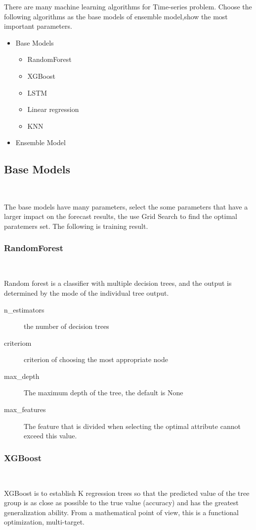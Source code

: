 There are many machine learning algorithms 
for Time-series problem. 
Choose the following algorithms
as the base models of ensemble model,show the most important parameters.

\begin{itemize}
    \item Base Models
	\
\begin{itemize}
	\item RandomForest 
	\item XGBoost
	\item LSTM
	\item Linear regression
	\item KNN
\end{itemize}
\item Ensemble Model
\end{itemize}
\subsection{Base Models}
\

The base models have many parameters,
select the some parameters that 
have a larger impact on 
the forecast results,
the use Grid Search to find 
the optimal paratemers set.	
The following is training result. 
\subsubsection{RandomForest}
\

Random forest is a classifier with 
multiple decision trees, and
the output is determined by 
the mode of the individual tree output.


\begin{description}
	\item[n_estimators] the number of decision trees
	\item[criteriom] criterion of choosing 
	the most appropriate node
	\item[max_depth] The maximum depth of the tree, 
	the default is None 
	\item[max_features] The feature that is divided 
	when selecting the optimal attribute 
	cannot exceed this value.
\end{description}
                  
	
\subsubsection{XGBoost}
\
 
XGBoost is to establish K regression trees 
so that the predicted value of 
the tree group is as close as possible to 
the true value (accuracy) and 
has the greatest generalization ability. 
From a mathematical point of view, 
this is a functional optimization, multi-target.

